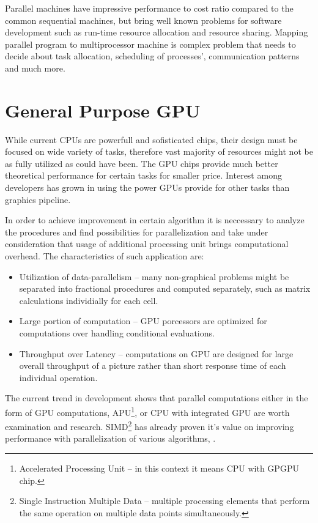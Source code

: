 Parallel machines have impressive performance to cost ratio compared to the
common sequential machines\cite{Darlington93structuredparallel}, but bring well
known problems for software development such as run-time resource allocation
and resource sharing. Mapping parallel program to multiprocessor machine is
complex problem that needs to decide about task allocation, scheduling of
processes', communication patterns and much more.

\section{General Purpose GPU}
While current CPUs are powerfull and sofisticated chips, their design must be
focused on wide variety of tasks, therefore vast majority of resources might
not be as fully utilized as could have been. The GPU chips provide much better
theoretical performance for certain tasks for smaller price\cite{Owens:2007:ASO}.
Interest among developers has grown in using the power GPUs provide for other
tasks than graphics pipeline. 

In order to achieve improvement in certain algorithm it is neccessary to analyze
the procedures and find possibilities for parallelization and take under 
consideration that usage of additional processing unit brings computational 
overhead. The characteristics of such application are\cite{Owens:2008:GC}:

\begin{itemize}
\item Utilization of data-parallelism -- many non-graphical problems might be
separated into fractional procedures and computed separately, such as matrix 
calculations individially for each cell.
\item Large portion of computation -- GPU porcessors are optimized for 
computations over handling conditional evaluations.
\item Throughput over Latency -- computations on GPU are designed for large
overall throughput of a picture rather than short response time of each 
individual operation.
\end{itemize}

The current trend in development shows that parallel computations either in the
form of GPU computations, APU\footnote{ Accelerated Processing Unit -- 
in this context it means CPU with GPGPU chip.}, or CPU with integrated GPU are
worth examination and research. SIMD\footnote{ Single Instruction Multiple Data 
-- multiple processing elements that perform the same operation on multiple data 
points simultaneously\cite{Flynn:1972}.} has already proven it's value on 
improving performance with parallelization of various 
algorithms\cite{nvidia:sample}, \cite{amd:apps}.

